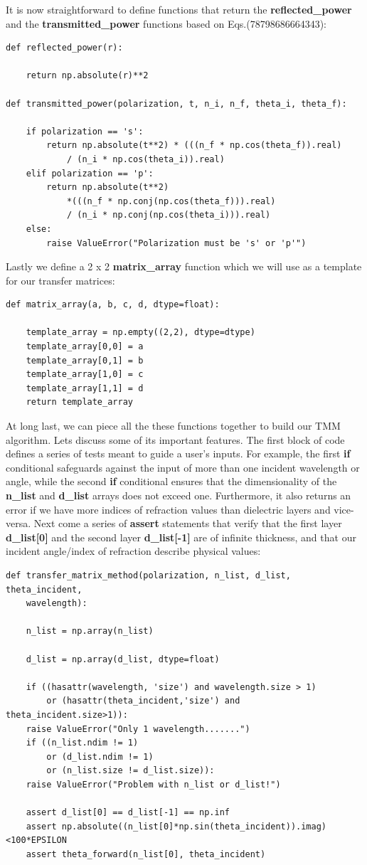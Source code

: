 \documentclass[preprint, onecolumn, amsmath, amssymb, aps]{revtex4-1}
\numberwithin{equation}{section}
\begin{document}
\noindent
It is now straightforward to define functions that return the \textbf{reflected\_power} and the \textbf{transmitted\_power} functions based on Eqs.(78798686664343):
\lstset{showspaces=false,showstringspaces=false}%
\begin{lstlisting}
def reflected_power(r):

	return np.absolute(r)**2

def transmitted_power(polarization, t, n_i, n_f, theta_i, theta_f):

	if polarization == 's':
		return np.absolute(t**2) * (((n_f * np.cos(theta_f)).real) 
			/ (n_i * np.cos(theta_i)).real)
	elif polarization == 'p':
		return np.absolute(t**2)
			*(((n_f * np.conj(np.cos(theta_f))).real) 
			/ (n_i * np.conj(np.cos(theta_i))).real)
	else:
		raise ValueError("Polarization must be 's' or 'p'")
\end{lstlisting}
\noindent
Lastly we define a 2 x 2 \textbf{matrix\_array} function which we will use as a template for our transfer matrices:
\lstset{showspaces=false,showstringspaces=false}%
\begin{lstlisting}
def matrix_array(a, b, c, d, dtype=float):

	template_array = np.empty((2,2), dtype=dtype)
	template_array[0,0] = a
	template_array[0,1] = b
	template_array[1,0] = c
	template_array[1,1] = d
	return template_array
\end{lstlisting}
\noindent
At long last, we can piece all the these functions together to build our TMM algorithm. Lets discuss some of its important features. The first block of code defines a series of tests meant to guide a user's inputs. For example, the first \textbf{if} conditional safeguards against the input of more than one incident wavelength or angle, while the second \textbf{if} conditional ensures that the dimensionality of the \textbf{n\_list} and \textbf{d\_list} arrays does not exceed one. Furthermore, it also returns an error if we have more indices of refraction values than dielectric layers and vice-versa. Next come a series of \textbf{assert} statements that verify that the first layer \textbf{d\_list[0]} and the second layer \textbf{d\_list[-1]} are of infinite thickness, and that our incident angle/index of refraction describe physical values: 
\lstset{showspaces=false,showstringspaces=false}%
\begin{lstlisting}
def transfer_matrix_method(polarization, n_list, d_list, theta_incident, 
	wavelength):

	n_list = np.array(n_list)

	d_list = np.array(d_list, dtype=float) 

	if ((hasattr(wavelength, 'size') and wavelength.size > 1)
		or (hasattr(theta_incident,'size') and theta_incident.size>1)):
	raise ValueError("Only 1 wavelength.......")
	if ((n_list.ndim != 1) 
		or (d_list.ndim != 1) 
		or (n_list.size != d_list.size)):
	raise ValueError("Problem with n_list or d_list!")

	assert d_list[0] == d_list[-1] == np.inf
	assert np.absolute((n_list[0]*np.sin(theta_incident)).imag)<100*EPSILON
	assert theta_forward(n_list[0], theta_incident)
\end{lstlisting}
\end{document}
